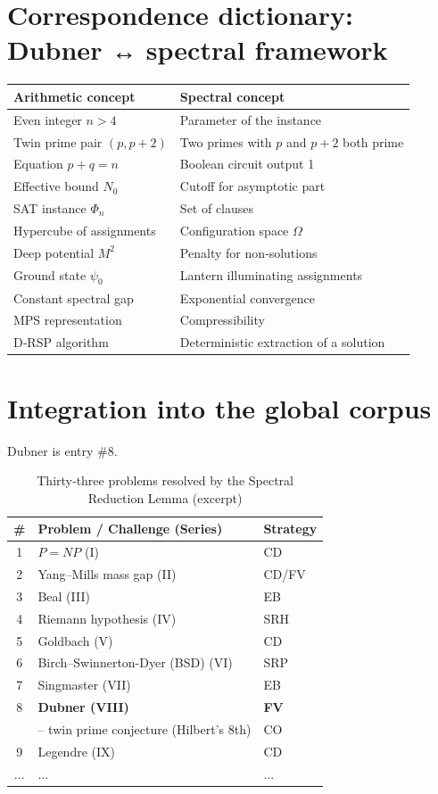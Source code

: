 \documentclass[11pt,a4paper]{article}
\begin{document}
\section{Correspondence dictionary: Dubner ↔ spectral framework}

\begin{center}
\small
\begin{tabular}{@{}l|l@{}}
\toprule
\textbf{Arithmetic concept} & \textbf{Spectral concept} \\
\midrule
Even integer $n > 4$ & Parameter of the instance \\
Twin prime pair $(p, p+2)$ & Two primes with $p$ and $p+2$ both prime \\
Equation $p+q = n$ & Boolean circuit output 1 \\
Effective bound $N_0$ & Cutoff for asymptotic part \\
SAT instance $\Phi_n$ & Set of clauses \\
Hypercube of assignments & Configuration space $\Omega$ \\
Deep potential $M^2$ & Penalty for non‑solutions \\
Ground state $\psi_0$ & Lantern illuminating assignments \\
Constant spectral gap & Exponential convergence \\
MPS representation & Compressibility \\
D‑RSP algorithm & Deterministic extraction of a solution \\
\bottomrule
\end{tabular}
\end{center}

\section{Integration into the global corpus}

Dubner is entry \#8.

\begin{center}
\small
\begin{longtable}{@{}cll@{}}
\caption{Thirty‑three problems resolved by the Spectral Reduction Lemma (excerpt)}\\
\toprule
\# & Problem / Challenge (Series) & Strategy \\
\midrule
1 & \(P = NP\) (I) & CD \\
2 & Yang–Mills mass gap (II) & CD/FV \\
3 & Beal (III) & EB \\
4 & Riemann hypothesis (IV) & SRH \\
5 & Goldbach (V) & CD \\
6 & Birch–Swinnerton-Dyer (BSD) (VI) & SRP \\
7 & Singmaster (VII) & EB \\
8 & \textbf{Dubner (VIII)} & \textbf{FV} \\
   & \quad – twin prime conjecture (Hilbert's 8th) & CO \\
9 & Legendre (IX) & CD \\
... & ... & ... \\
\bottomrule
\end{longtable}
\end{center}
\end{document}
